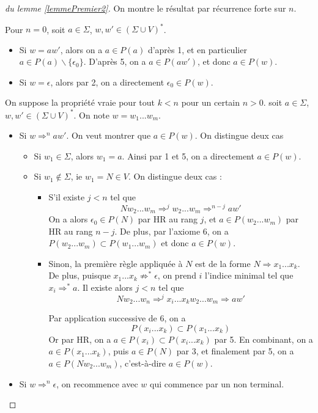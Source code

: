 \begin{proof}[du lemme \ref{lemmePremier2}]
On montre le résultat par récurrence forte sur $n$. 

Pour $n=0$, soit $a\in \Sigma$, $w,w' \in (\Sigma \cup V)^*$.

\begin{itemize} 
\item Si $w=aw'$, alors on a $a\in P(a)$ d'après 1, et en particulier $a\in P(a)\backslash \{\epsilon_0\}$. D'après 5, on a $a\in P(aw')$, et donc $a\in P(w)$.
\item Si $w=\epsilon$, alors par 2, on a directement $\epsilon_0\in P(w)$.
\end{itemize}


On suppose la propriété vraie pour tout $k< n$ pour un certain $n>0$. soit $a\in \Sigma$, $w,w' \in (\Sigma \cup V)^*$. On note $w=w_1...w_m$.

\begin{itemize}
\item Si $w\Rightarrow^n aw'$. On veut montrer que $a\in P(w)$. On distingue deux cas 
\begin{itemize}
\item Si $w_1\in \Sigma$, alors $w_1=a$. Ainsi par 1 et 5, on a directement $a\in P(w)$.
\item Si $w_1\notin \Sigma$, ie $w_1=N\in V$. On distingue deux cas :
\begin{itemize}
\item S'il existe $j<n$ tel que 
$$
Nw_2...w_m \Rightarrow^j w_2...w_m \Rightarrow^{n-j} aw'
$$
On a alors $\epsilon_0 \in P(N)$ par HR au rang $j$, et $a\in P(w_2...w_m)$ par HR au rang $n-j$. De plus, par l'axiome 6, on a $P(w_2...w_m) \subset P(w_1...w_m)$ et donc $a\in P(w)$.
\item Sinon, la première règle appliquée à $N$ est de la forme $N\Rightarrow x_1...x_k$. De plus, puisque $x_1...x_k \not \Rightarrow^* \epsilon$, on prend $i$ l'indice minimal tel que $x_i \Rightarrow^* a$. Il existe alors $j<n$ tel que 
$$
Nw_2...w_n \Rightarrow^j x_i...x_k w_2...w_m \Rightarrow aw'
$$

Par application successive de 6, on a 
$$
P(x_i...x_k) \subset P(x_1...x_k)
$$
Or par HR, on a $a\in P(x_i)\subset P(x_i...x_k)$ par 5. En combinant, on a $a\in P(x_1...x_k)$, puis $a\in P(N)$ par 3, et finalement par 5, on a $a\in P(Nw_2...w_m)$, c'est-à-dire $a\in P(w)$.
\end{itemize}
\end{itemize}
\item Si $w\Rightarrow^n\epsilon$, on recommence avec $w$ qui commence par un non terminal.
\end{itemize}
\end{proof}

